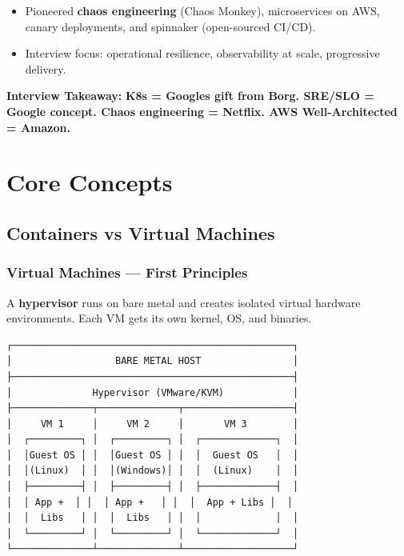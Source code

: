 \documentclass[11pt]{article}
\providecommand{\tightlist}{\setlength{\itemsep}{1pt}\setlength{\parskip}{0pt}}
\begin{document}
\begin{itemize}
\tightlist
\item
  Pioneered \textbf{chaos engineering} (Chaos Monkey), microservices on AWS, canary deployments, and spinnaker (open-sourced CI/CD).
\item
  Interview focus: operational resilience, observability at scale, progressive delivery.
\end{itemize}

\textbf{Interview Takeaway:} \textbf{K8s = Google\textquotesingle s gift from Borg. SRE/SLO = Google concept. Chaos engineering = Netflix. AWS Well-Architected = Amazon.}

\section{Core Concepts}\label{core-concepts}

\subsection{Containers vs Virtual Machines}\label{containers-vs-virtual-machines}

\subsubsection{Virtual Machines --- First Principles}\label{virtual-machines--first-principles}

A \textbf{hypervisor} runs on bare metal and creates isolated virtual hardware environments. Each VM gets its own kernel, OS, and binaries.

\setcodelang{}

\begin{verbatim}
┌─────────────────────────────────────────────────┐
│                  BARE METAL HOST                │
├─────────────────────────────────────────────────┤
│              Hypervisor (VMware/KVM)            │
├──────────────┬──────────────┬───────────────────┤
│     VM 1     │     VM 2     │       VM 3        │
│  ┌─────────┐ │  ┌─────────┐ │  ┌─────────────┐  │
│  │Guest OS │ │  │Guest OS │ │  │  Guest OS   │  │
│  │(Linux)  │ │  │(Windows)│ │  │  (Linux)    │  │
│  ├─────────┤ │  ├─────────┤ │  ├─────────────┤  │
│  │ App +  │ │  │ App +   │ │  │  App + Libs │  │
│  │  Libs   │ │  │  Libs   │ │  │             │  │
│  └─────────┘ │  └─────────┘ │  └─────────────┘  │
└──────────────┴──────────────┴───────────────────┘
\end{verbatim}
\end{document}
